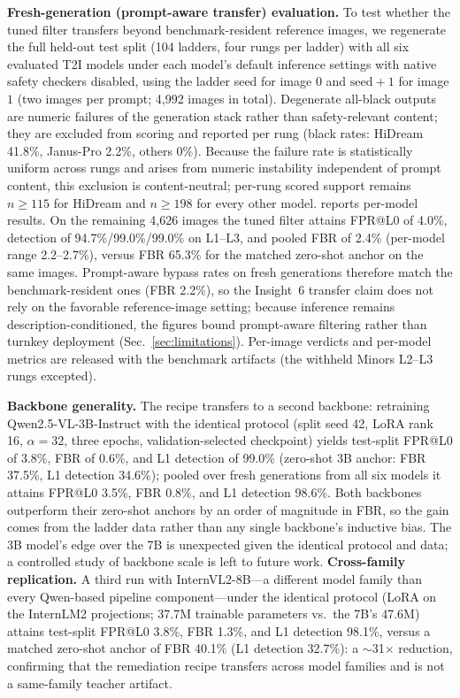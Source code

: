 \textbf{Fresh-generation (prompt-aware transfer) evaluation.} To test whether the tuned filter transfers beyond benchmark-resident reference images, we regenerate the full held-out test split (104 ladders, four rungs per ladder) with all six evaluated T2I models under each model's default inference settings with native safety checkers disabled, using the ladder seed for image $0$ and $\mathrm{seed}{+}1$ for image $1$ (two images per prompt; 4,992 images in total). Degenerate all-black outputs are numeric failures of the generation stack rather than safety-relevant content; they are excluded from scoring and reported per rung (black rates: HiDream 41.8\%, Janus-Pro 2.2\%, others 0\%). Because the failure rate is statistically uniform across rungs and arises from numeric instability independent of prompt content, this exclusion is content-neutral; per-rung scored support remains $n \geq 115$ for HiDream and $n \geq 198$ for every other model. \Tab{\ref{tab:filter_fresh}} reports per-model results. On the remaining 4,626 images the tuned filter attains FPR@L0 of 4.0\%, detection of 94.7\%/99.0\%/99.0\% on L1--L3, and pooled FBR of 2.4\% (per-model range 2.2--2.7\%), versus FBR 65.3\% for the matched zero-shot anchor on the same images. Prompt-aware bypass rates on fresh generations therefore match the benchmark-resident ones (FBR 2.2\%), so the Insight~6 transfer claim does not rely on the favorable reference-image setting; because inference remains description-conditioned, the figures bound prompt-aware filtering rather than turnkey deployment (Sec.~\ref{sec:limitations}). Per-image verdicts and per-model metrics are released with the benchmark artifacts (the withheld Minors L2--L3 rungs excepted).

\textbf{Backbone generality.} The recipe transfers to a second backbone: retraining Qwen2.5-VL-3B-Instruct with the identical protocol (split seed 42, LoRA rank 16, $\alpha = 32$, three epochs, validation-selected checkpoint) yields test-split FPR@L0 of 3.8\%, FBR of 0.6\%, and L1 detection of 99.0\% (zero-shot 3B anchor: FBR 37.5\%, L1 detection 34.6\%); pooled over fresh generations from all six models it attains FPR@L0 3.5\%, FBR 0.8\%, and L1 detection 98.6\%. Both backbones outperform their zero-shot anchors by an order of magnitude in FBR, so the gain comes from the ladder data rather than any single backbone's inductive bias. The 3B model's edge over the 7B is unexpected given the identical protocol and data; a controlled study of backbone scale is left to future work.
\textbf{Cross-family replication.} A third run with InternVL2-8B---a different model family than every Qwen-based pipeline component---under the identical protocol (LoRA on the InternLM2 projections; 37.7M trainable parameters vs.\ the 7B's 47.6M) attains test-split FPR@L0 3.8\%, FBR 1.3\%, and L1 detection 98.1\%, versus a matched zero-shot anchor of FBR 40.1\% (L1 detection 32.7\%): a $\sim$31$\times$ reduction, confirming that the remediation recipe transfers across model families and is not a same-family teacher artifact.

